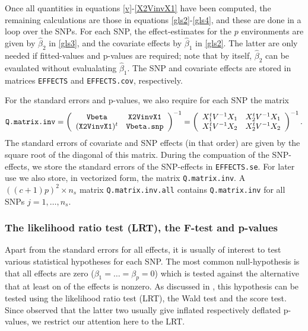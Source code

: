 \documentclass[12pt]{article}
\begin{document}
Once all quantities in equations \eqref{v}-\eqref{X2VinvX1} have been computed, the remaining calculations are those in equations \eqref{gls2}-\eqref{gls4}, and these are done in a loop over the SNPs. For each SNP, the effect-estimates for the $p$ environments are given by $\hat \beta_2$ in \eqref{gls3}, and the covariate effects by $\hat \beta_1$ in \eqref{gls2}. The latter are only needed if fitted-values and p-values are required; note that by itself, $\hat \beta_2$ can be evaulated without evalualating  $\hat \beta_1$. The SNP and covariate effects are stored in matrices \verb|EFFECTS| and \verb|EFFECTS.cov|, respectively.

For the standard errors and p-values, we also require for each SNP the matrix
%
\begin{equation} \label{Q.matrix.inv}
\verb|Q.matrix.inv| = 
\left(
\begin{array}{cc}
\verb|Vbeta| & \verb|X2VinvX1| \\
(\verb|X2VinvX1|)^t & \verb|Vbeta.snp|
\end{array}
\right)^{-1}
=
\left(
\begin{array}{cc}
X_1^t V^{-1} X_1 & X_2^t V^{-1} X_1 \\
X_1^t V^{-1} X_2 & X_2^t V^{-1} X_2
\end{array}
\right)^{-1}.
\end{equation}
%
The standard errors of covariate and SNP effects (in that order) are given by the square root of the diagonal of this matrix. During the compuation of the SNP-effects, we store the standard errors of the SNP-effects in \verb|EFFECTS.se|. For later use we also store, in vectorized form, the matrix \verb|Q.matrix.inv|. A $((c+1)p)^2 \times n_s$ matrix \verb|Q.matrix.inv.all| contains \verb|Q.matrix.inv| for all SNPs $j=1,\ldots,n_s$.

\subsubsection{The likelihood ratio test (LRT), the F-test and p-values} \label{test_section}

Apart from the standard errors for all effects, it is usually of interest to test various statistical hypotheses for each SNP. The most common null-hypothesis is that all effects are zero ($\beta_1=\ldots = \beta_p=0$) which is tested against the alternative that at least on of the effects is nonzero.  As discussed in \cite{zhou_stephens_2014}, this hypothesis can be tested using the likelihood ratio test (LRT), the Wald test and the score test. Since \cite{zhou_stephens_2014} observed that the latter two usually give inflated respectively deflated p-values, we restrict our attention here to the LRT.
\end{document}
